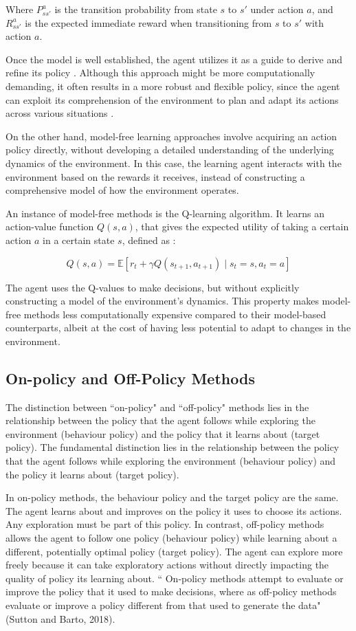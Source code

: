 Where $P_{ss'}^{a}$ is the transition probability from state $s$ to $s'$ under action $a$, and $R_{ss'}^{a}$ is the expected immediate reward when transitioning from $s$ to $s'$ with action $a$.

Once the model is well established, the agent utilizes it as a guide to derive and refine its policy \cite{RL2}. Although this approach might be more computationally demanding, it often results in a more robust and flexible policy, since the agent can exploit its comprehension of the environment to plan and adapt its actions across various situations \cite{RL}.

On the other hand, model-free learning approaches involve acquiring an action policy directly, without developing a detailed understanding of the underlying dynamics of the environment. In this case, the learning agent interacts with the environment based on the rewards it receives, instead of constructing a comprehensive model of how the environment operates.

An instance of model-free methods is the Q-learning algorithm. It learns an action-value function $Q(s,a)$, that gives the expected utility of taking a certain action $a$ in a certain state $s$, defined as \cite{RL3}:

\[
Q(s,a) = \mathbb{E}[r_t + \gamma Q(s_{t+1}, a_{t+1}) \mid s_t=s, a_t=a]
\]

The agent uses the Q-values to make decisions, but without explicitly constructing a model of the environment's dynamics. This property makes model-free methods less computationally expensive compared to their model-based counterparts, albeit at the cost of having less potential to adapt to changes in the environment.



\subsection{On-policy and Off-Policy Methods}
The distinction between ``on-policy" and ``off-policy" methods lies in the relationship between the policy that the agent follows while exploring the environment (behaviour policy) and the policy that it learns about (target policy). 
The fundamental distinction lies in the relationship between the policy that the agent follows while exploring the environment (behaviour policy) and the policy it learns about (target policy). 

In on-policy methods, the behaviour policy and the target policy are the same. The agent learns about and improves on the policy it uses to choose its actions. Any exploration must be part of this policy. In contrast, off-policy methods allows the agent to follow one policy (behaviour policy) while learning about a different, potentially optimal policy (target policy). The agent can explore more freely because it can take exploratory actions without directly impacting the quality of policy its learning about. 
`` On-policy methods attempt to evaluate or improve the policy that it used to make decisions, where as off-policy methods evaluate or improve a policy different from that used to generate the data" (Sutton and Barto, 2018).


